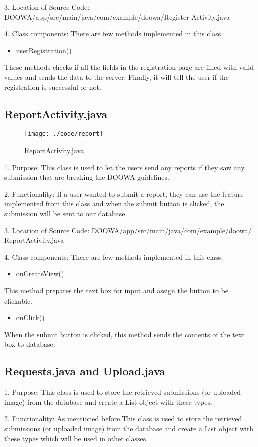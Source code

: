 \documentclass[conference]{IEEEtran}
\begin{document}
3. Location of Source Code: DOOWA/app/src/main/java/com/example/doowa/Register Activity.java\break

4. Class components: There are few methods implemented in this class.
\begin{itemize}
\item userRegistration()
\end{itemize}
These methods checks if all the fields in the registration page are filled with valid values and sends the data to the server. Finally, it will tell the user if the registration is successful or not.
\break
\subsection{ReportActivity.java}
\begin{figure}[h!]
\texttt{[image: ./code/report]}
\centering
\caption{ReportActivity.java}
\end{figure}
1. Purpose: This class is used to let the users send any reports if they saw any submission that are breaking the DOOWA guidelines.\break
\par 2. Functionality: If a user wanted to submit a report, they can use the feature implemented from this class and when the submit button is clicked, the submission will be sent to our database.\break

3. Location of Source Code: DOOWA/app/src/main/java/com/example/doowa/ ReportActivity.java\break

4. Class components: There are few methods implemented in this class.
\begin{itemize}
\item onCreateView()
\end{itemize}
This method prepares the text box for input and assign the button to be clickable.
\begin{itemize}
\item onClick()
\end{itemize}
When the submit button is clicked, this method sends the contents of the text box to database.
\break
\subsection{Requests.java and Upload.java}

1. Purpose: This class is used to store the retrieved submissions (or uploaded image) from the database and create a List object with these types.\break
\par 2. Functionality: As mentioned before.This class is used to store the retrieved submissions (or uploaded image) from the database and create a List object with these types which will be used in other classes.\break
\end{document}
